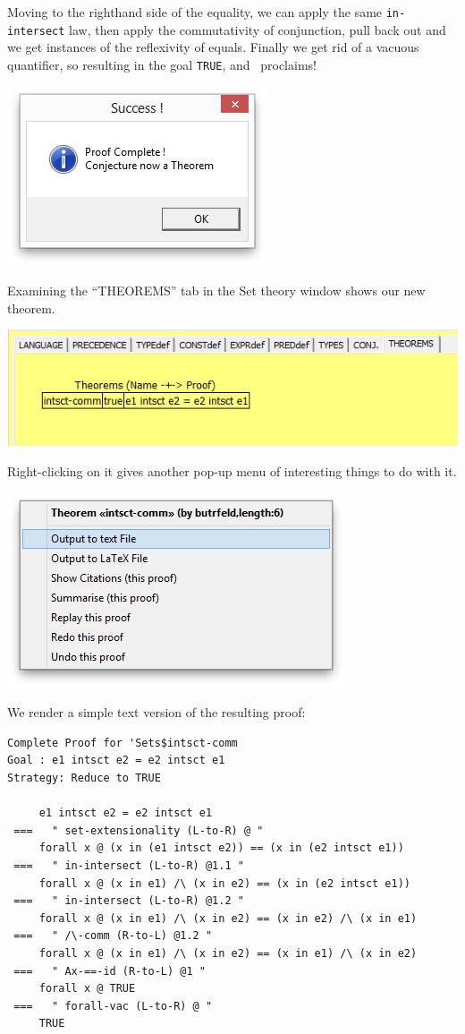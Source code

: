 \documentclass[copyright]{eptcs}
\begin{document}
\noindent
Moving to the righthand side of the equality, we can apply the same \texttt{in-intersect} law,
then apply the commutativity of conjunction, pull back out and we get
instances of the reflexivity of equals. Finally we get rid of a vacuous quantifier,
so resulting in the goal \texttt{TRUE}, and \ proclaims!

\includegraphics[scale=0.5]{17-proof-complete.png}

\noindent
Examining the ``THEOREMS'' tab in the Set theory window shows our new theorem.

\includegraphics[scale=0.5]{20-our-new-theorem.png}

\noindent
Right-clicking on it gives another pop-up menu of interesting things to do with it.

  \includegraphics[scale=0.5]{21-saving-text-version.png}

\noindent
We render a simple text version of the resulting proof:
\begin{verbatim}
Complete Proof for 'Sets$intsct-comm
Goal : e1 intsct e2 = e2 intsct e1
Strategy: Reduce to TRUE

     e1 intsct e2 = e2 intsct e1
 ===   " set-extensionality (L-to-R) @ "
     forall x @ (x in (e1 intsct e2)) == (x in (e2 intsct e1))
 ===   " in-intersect (L-to-R) @1.1 "
     forall x @ (x in e1) /\ (x in e2) == (x in (e2 intsct e1))
 ===   " in-intersect (L-to-R) @1.2 "
     forall x @ (x in e1) /\ (x in e2) == (x in e2) /\ (x in e1)
 ===   " /\-comm (R-to-L) @1.2 "
     forall x @ (x in e1) /\ (x in e2) == (x in e1) /\ (x in e2)
 ===   " Ax-==-id (R-to-L) @1 "
     forall x @ TRUE
 ===   " forall-vac (L-to-R) @ "
     TRUE
\end{verbatim}
\end{document}
